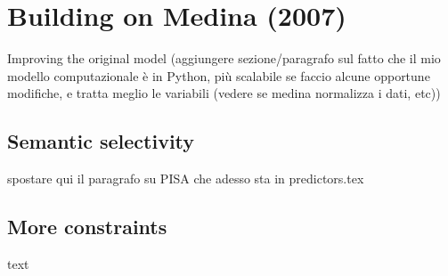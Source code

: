 

\section{Building on Medina (2007)} 

Improving the original model (aggiungere sezione/paragrafo sul fatto che il mio modello computazionale è in Python, più scalabile se faccio alcune opportune modifiche, e tratta meglio le variabili (vedere se medina normalizza i dati, etc))


\subsection{Semantic selectivity} 

spostare qui il paragrafo su PISA che adesso sta in predictors.tex


\subsection{More constraints} 

text



